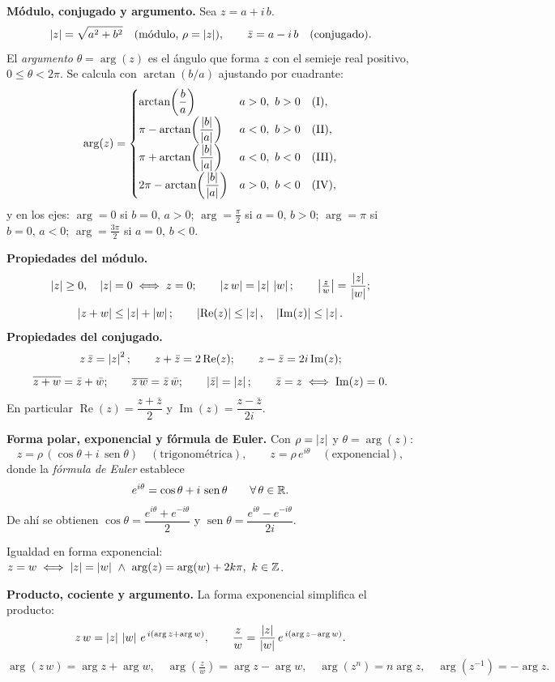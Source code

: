\begin{teoria}
\textbf{Módulo, conjugado y argumento.} Sea $z = a + i\,b$.
\[
\left\lvert z \right\rvert = \sqrt{a^2 + b^2} \quad (\text{módulo, } \rho = \left\lvert z \right\rvert), \qquad
\bar z = a - i\,b \quad (\text{conjugado}).
\]
El \emph{argumento} $\theta = \arg(z)$ es el ángulo que forma $z$ con el semieje real positivo, $0 \le \theta < 2\pi$. Se calcula con $\arctan(b/a)$ ajustando por cuadrante:
\[
\arg(z) = \begin{cases}
\arctan\!\left(\dfrac{b}{a}\right) & a > 0,\ b > 0 \quad (\text{I}), \\[2mm]
\pi - \arctan\!\left(\dfrac{\left\lvert b \right\rvert}{\left\lvert a \right\rvert}\right) & a < 0,\ b > 0 \quad (\text{II}), \\[2mm]
\pi + \arctan\!\left(\dfrac{\left\lvert b \right\rvert}{\left\lvert a \right\rvert}\right) & a < 0,\ b < 0 \quad (\text{III}), \\[2mm]
2\pi - \arctan\!\left(\dfrac{\left\lvert b \right\rvert}{\left\lvert a \right\rvert}\right) & a > 0,\ b < 0 \quad (\text{IV}),
\end{cases}
\]
y en los ejes: $\arg = 0$ si $b=0,\,a>0$; $\arg = \tfrac{\pi}{2}$ si $a=0,\,b>0$; $\arg = \pi$ si $b=0,\,a<0$; $\arg = \tfrac{3\pi}{2}$ si $a=0,\,b<0$.

\medskip
\textbf{Propiedades del módulo.}
\[
\left\lvert z \right\rvert \ge 0,\quad \left\lvert z \right\rvert=0 \iff z=0; \qquad \left\lvert z\,w \right\rvert = \left\lvert z \right\rvert\,\left\lvert w \right\rvert; \qquad \left\lvert \tfrac{z}{w} \right\rvert = \frac{\left\lvert z \right\rvert}{\left\lvert w \right\rvert};
\]
\[
\left\lvert z+w \right\rvert \le \left\lvert z \right\rvert+\left\lvert w \right\rvert; \qquad \left\lvert \operatorname{Re}(z) \right\rvert \le \left\lvert z \right\rvert,\quad \left\lvert \operatorname{Im}(z) \right\rvert \le \left\lvert z \right\rvert.
\]
\textbf{Propiedades del conjugado.}
\[
z\,\bar z = \left\lvert z \right\rvert^2; \qquad z + \bar z = 2\operatorname{Re}(z); \qquad z - \bar z = 2i\operatorname{Im}(z);
\]
\[
\overline{z+w} = \bar z + \bar w; \qquad \overline{z\,w} = \bar z\,\bar w; \qquad \left\lvert \bar z \right\rvert = \left\lvert z \right\rvert; \qquad \bar z = z \iff \operatorname{Im}(z)=0.
\]
En particular $\operatorname{Re}(z) = \dfrac{z + \bar z}{2}$ y $\operatorname{Im}(z) = \dfrac{z - \bar z}{2i}$.
\end{teoria}

\begin{teoria}
\textbf{Forma polar, exponencial y fórmula de Euler.} Con $\rho = \left\lvert z \right\rvert$ y $\theta = \arg(z)$:
\[
z = \rho\,(\cos\theta + i\,\operatorname{sen}\theta) \quad (\text{trigonométrica}), \qquad
z = \rho\, e^{i\theta} \quad (\text{exponencial}),
\]
donde la \emph{fórmula de Euler} establece
\[
e^{i\theta} = \cos\theta + i\,\operatorname{sen}\theta \qquad \forall\,\theta \in \mathbb{R}.
\]
De ahí se obtienen $\cos\theta = \dfrac{e^{i\theta} + e^{-i\theta}}{2}$ y $\operatorname{sen}\theta = \dfrac{e^{i\theta} - e^{-i\theta}}{2i}$.

Igualdad en forma exponencial: $z = w \iff \left\lvert z \right\rvert=\left\lvert w \right\rvert \ \wedge\ \arg(z) = \arg(w) + 2k\pi,\ k \in \mathbb{Z}$.

\medskip
\textbf{Producto, cociente y argumento.} La forma exponencial simplifica el producto:
\[
z\,w = \left\lvert z \right\rvert\,\left\lvert w \right\rvert\,e^{\,i(\arg z + \arg w)}, \qquad
\frac{z}{w} = \frac{\left\lvert z \right\rvert}{\left\lvert w \right\rvert}\,e^{\,i(\arg z - \arg w)}.
\]
\[
\arg(z\,w) = \arg z + \arg w, \quad \arg\!\left(\tfrac{z}{w}\right) = \arg z - \arg w, \quad \arg(z^n) = n\arg z, \quad \arg(z^{-1}) = -\arg z.
\]
\end{teoria}

